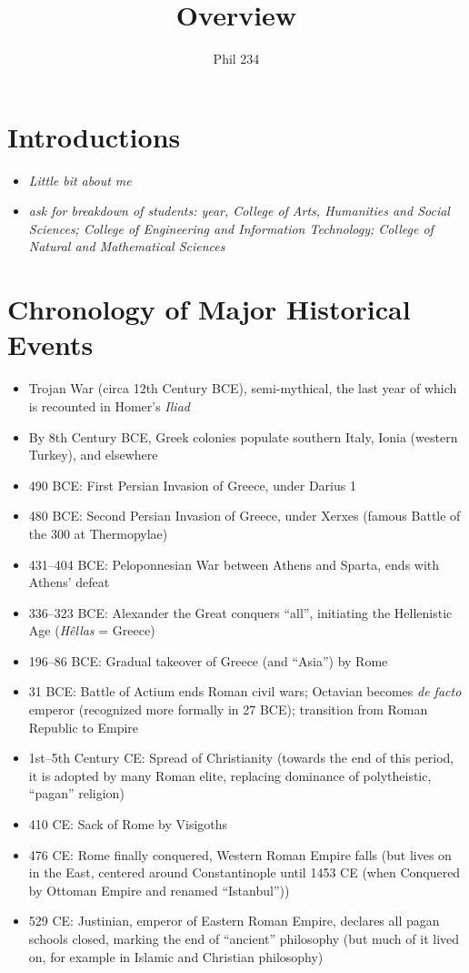 \documentclass[11pt]{article}
\begin{document}
\author{Phil 234}
\title{Overview}
\maketitle

\section*{Introductions}
\begin{itemize}\item{\emph{Little bit about me}}\item{\emph{ask for breakdown of students: year, College of Arts, Humanities and Social Sciences; College of Engineering and Information Technology; College of Natural and Mathematical Sciences}}\end{itemize}

\section*{Chronology of Major Historical Events}
\begin{itemize}
\item{Trojan War (circa 12th Century BCE), semi-mythical, the last year of which is recounted in Homer's \emph{Iliad}}
\item{By 8th Century BCE, Greek colonies populate southern Italy, Ionia (western Turkey), and elsewhere}
\item{490 BCE: First Persian Invasion of Greece, under Darius 1}
\item{480 BCE: Second Persian Invasion of Greece, under Xerxes (famous Battle of the 300 at Thermopylae)}
\item{431--404 BCE: Peloponnesian War between Athens and Sparta, ends with Athens' defeat}
\item{336--323 BCE: Alexander the Great conquers ``all'', initiating the Hellenistic Age (\emph{H\^{e}llas} = Greece)}
\item{196--86 BCE: Gradual takeover of Greece (and ``Asia'') by Rome}
\item{31 BCE: Battle of Actium ends Roman civil wars; Octavian becomes \emph{de facto} emperor (recognized more formally in 27 BCE); transition from Roman Republic to Empire}
\item{1st--5th Century CE: Spread of Christianity (towards the end of this period, it is adopted by many Roman elite, replacing dominance of polytheistic, ``pagan'' religion)}
\item{410 CE: Sack of Rome by Visigoths}
\item{476 CE: Rome finally conquered, Western Roman Empire falls (but lives on in the East, centered around Constantinople until 1453 CE (when Conquered by Ottoman Empire and renamed ``Istanbul''))}
\item{529 CE: Justinian, emperor of Eastern Roman Empire, declares all pagan schools closed, marking the end of ``ancient'' philosophy (but much of it lived on, for example in Islamic and Christian philosophy)}
\end{itemize}
\end{document}
